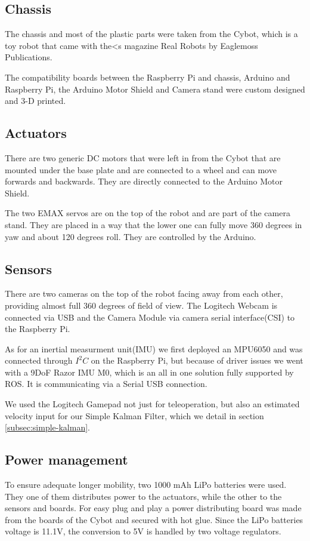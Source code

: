 \documentclass[class=article, crop=false]{standalone}
\begin{document}
\subsection{Chassis}\label{subsec:chassis}
The chassis and most of the plastic parts were taken from the Cybot, which is a toy robot that came with the<s magazine Real Robots by Eaglemoss Publications\footnotemark.


The compatibility boards between the Raspberry Pi and chassis, Arduino and Raspberry Pi, the Arduino Motor Shield and Camera stand were custom designed and 3-D printed.

\subsection{Actuators}\label{subsec:actuators}
There are two generic DC motors that were left in from the Cybot that are mounted under the base plate and are connected to a wheel and can move forwards and backwards. They are directly connected to the Arduino Motor Shield.

The two EMAX servos are on the top of the robot and are part of the camera stand. They are placed in a way that the lower one can fully move 360 degrees in yaw and about 120 degrees roll. They are controlled by the Arduino.

\subsection{Sensors}\label{subsec:sensors}
There are two cameras on the top of the robot facing away from each other, providing almost full 360 degrees of field of view. The Logitech Webcam is connected via USB and the Camera Module via camera serial interface(CSI) to the Raspberry Pi.

As for an inertial measurment unit(IMU) we first deployed an MPU6050 and was connected through $ I^2C $ on the Raspberry Pi, but because of driver issues we went with a 9DoF Razor IMU M0, which is an all in one solution fully supported by ROS. It is communicating via a Serial USB connection.

We used the Logitech Gamepad not just for teleoperation, but also an estimated velocity input for our Simple Kalman Filter, which we detail in section \ref{subsec:simple-kalman}.

\subsection{Power management}\label{subsec:power}
To ensure adequate longer mobility, two 1000 mAh LiPo batteries were used. They one of them distributes power to the actuators, while the other to the sensors and boards. For easy plug and play a power distributing board was made from the boards of the Cybot and secured with hot glue. Since the LiPo batteries voltage is 11.1V, the conversion to 5V is handled by two voltage regulators.
\end{document}
